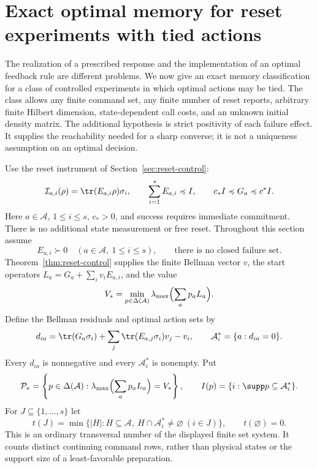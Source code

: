 \section{Exact optimal memory for reset experiments with tied actions}
\label{sec:r77-reset-memory}

The realization of a prescribed response and the implementation of an
optimal feedback rule are different problems.  We now give an exact
memory classification for a class of controlled experiments in which
optimal actions may be tied.  The class allows any finite command set,
any finite number of reset reports, arbitrary finite Hilbert dimension,
state-dependent call costs, and an unknown initial density matrix.
The additional hypothesis is strict positivity of each failure effect.
It supplies the reachability needed for a sharp converse; it is not a
uniqueness assumption on an optimal decision.

Use the reset instrument of Section~\ref{sec:reset-control}:
\[
 \mathcal I_{a,i}(\rho)=\tr(E_{a,i}\rho)\sigma_i,
 \qquad \sum_{i=1}^s E_{a,i}\preccurlyeq I,
 \qquad c_*I\preccurlyeq G_a\preccurlyeq c^*I.
\]
Here $a\in\mathcal A$, $1\le i\le s$, $c_*>0$, and success requires
immediate commitment.  There is no additional state measurement or
free reset.  Throughout this section assume
\begin{equation}\label{eq:r77-reset-positive}
 E_{a,i}\succ0\quad(a\in\mathcal A,\ 1\le i\le s),
 \qquad\text{there is no closed failure set.}
\end{equation}
Theorem~\ref{thm:reset-control} supplies the finite Bellman vector $v$,
the start operators $L_a=G_a+\sum_i v_iE_{a,i}$, and the value
\[
 V_* =\min_{p\in\Delta(\mathcal A)}
       \lambda_{\max}\Bigl(\sum_a p_aL_a\Bigr).
\]
Define the Bellman residuals and optimal action sets by
\[
 d_{ia}=\tr(G_a\sigma_i)+\sum_j\tr(E_{a,j}\sigma_i)v_j-v_i,
 \qquad \mathcal A_i^*=\{a:d_{ia}=0\}.
\]
Every $d_{ia}$ is nonnegative and every $\mathcal A_i^*$ is nonempty.
Put
\[
 \mathcal P_* =\left\{p\in\Delta(\mathcal A):
       \lambda_{\max}\Bigl(\sum_a p_aL_a\Bigr)=V_*\right\},
 \qquad I(p)=\{i:\supp p\subseteq\mathcal A_i^*\}.
\]
For $J\subseteq\{1,\ldots,s\}$ let
\begin{equation}\label{eq:r77-transversal}
 t(J)=\min\{|H|:H\subseteq\mathcal A,
               \ H\cap\mathcal A_i^*\ne\varnothing\ (i\in J)\},
 \qquad t(\varnothing)=0.
\end{equation}
This is an ordinary transversal number of the displayed finite set
system.  It counts distinct continuing command rows, rather than
physical states or the support size of a least-favorable preparation.

